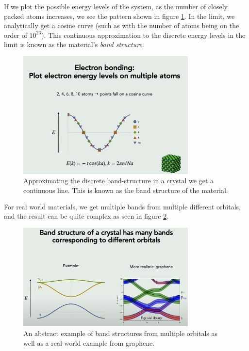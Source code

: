 \documentclass[a4paper]{article}
\begin{document}
    If we plot the possible energy levels of the system, as the number of closely packed atoms increases, we see the pattern shown in figure \ref{fig:discrete-band-structure}. In the limit, we analytically get a cosine curve (such as with the number of atoms being on the order of \(10^{23} \)). This continuous approximation to the discrete energy levels in the limit is known as the material's \textit{band structure}.

    \begin{figure}[H]
        \centering
        \includegraphics[width=0.8\textwidth]{discrete-band-structure.png}
        \caption{Approximating the discrete band-structure in a crystal we get a continuous line. This is known as the band structure of the material.}
        \label{fig:discrete-band-structure}
    \end{figure}

    For real world materials, we get multiple bands from multiple different orbitals, and the result can be quite complex as seen in figure \ref{fig:band-structure-example}.

    \begin{figure}[H]
        \centering
        \includegraphics[width=0.8\textwidth]{band-structure-example.png}
        \caption{An abstract example of band structures from multiple orbitals as well as a real-world example from graphene.}
        \label{fig:band-structure-example}
    \end{figure}
\end{document}
